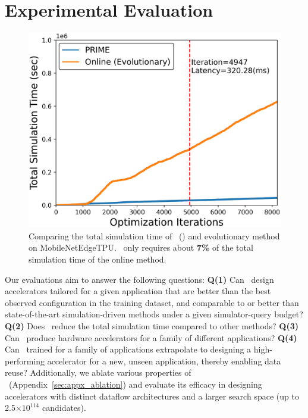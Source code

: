 \vspace{-0.2cm}
\section{Experimental Evaluation}
\label{sec:eval}
\vspace{-0.2cm}
%
\begin{figure}
    \centering
    \vspace{-0.45cm}
    \includegraphics[width=0.98\linewidth]{chapters/prime/figs/motivation/simulation_time.png}
    \vspace{-0.3cm}
    \caption{\footnotesize{Comparing the total simulation time of \primemethodname\ () and evolutionary method on MobileNetEdgeTPU. \primemethodname\ only requires about \textbf{7\%} of the total simulation time of the online method.}}
    \vspace{-0.35cm}
    \label{fig:convergence_time}
\end{figure}
Our evaluations aim to answer the following questions: \textbf{Q(1)} {Can \primemethodname\ design accelerators tailored for a given application that are better than the best observed configuration in the training dataset, and comparable to or better than state-of-the-art simulation-driven methods under a given simulator-query budget?} \textbf{Q(2)} {Does \primemethodname\ reduce the total simulation time compared to other methods?} \textbf{Q(3)} {Can \primemethodname\ produce hardware accelerators for a family of different applications?} \textbf{Q(4)} {Can \primemethodname\ trained for a family of applications extrapolate to designing a high-performing accelerator for a new, unseen application, thereby enabling data reuse?} Additionally, we ablate various properties of \primemethodname\ (Appendix~\ref{sec:appx_ablation}) and evaluate its efficacy in designing accelerators with distinct dataflow architectures and a larger search space (up to 2.5$\times10^{114}$ candidates).

